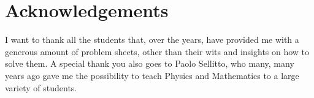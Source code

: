 \chapter*{Acknowledgements}
I want to thank all the students that, over the years, have provided me with a generous amount of problem sheets, other than their wits and insights on how to solve them. A special thank you also goes to Paolo Sellitto, who many, many years ago gave me the possibility to teach Physics and Mathematics to a large variety of students.